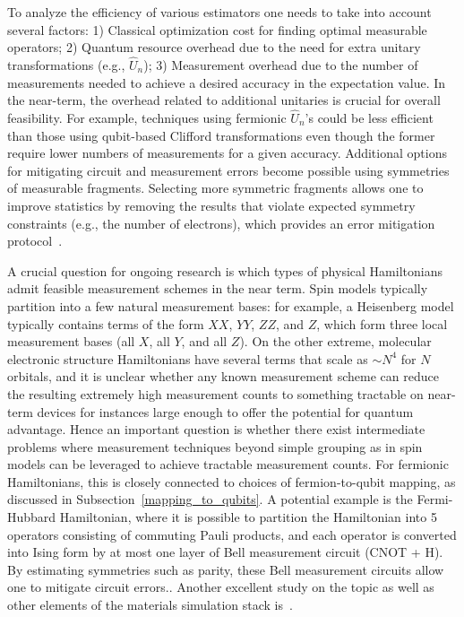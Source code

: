 To analyze the efficiency of various estimators one needs to take into account several factors: 1) Classical optimization cost for finding optimal measurable operators; 2) Quantum resource overhead due to the need for extra unitary transformations (e.g., $\hat U_n$); 3) Measurement overhead due to the number of measurements needed to achieve a desired accuracy in the expectation value. In the near-term, the overhead related to additional unitaries is crucial for overall feasibility.
For example, techniques using fermionic $\hat U_n$'s \cite{Huggins_Babbush:2021,motta2021low,yen2021cartan,choi2023fluid} could be less efficient than those using qubit-based Clifford transformations \cite{choi2022improving,yen2023deterministic} even though the former require lower numbers of measurements for a given accuracy.
Additional options for mitigating circuit and measurement errors become possible using symmetries of measurable fragments.
Selecting more symmetric fragments allows one to improve statistics by removing the results that violate expected symmetry constraints (e.g., the number of electrons), which provides an error mitigation protocol~\cite{Cai_2021,cai2023quantum,cohn2021quantum}.

A crucial question for ongoing research is which types of physical Hamiltonians admit feasible measurement schemes in the near term.
Spin models typically partition into a few natural measurement bases: for example, a Heisenberg model typically contains terms of the form $XX$, $YY$, $ZZ$, and $Z$, which form three local measurement bases (all $X$, all $Y$, and all $Z$).
On the other extreme, molecular electronic structure Hamiltonians have several terms that scale as $\sim N^4$ for $N$ orbitals, and it is unclear whether any known measurement scheme can reduce the resulting extremely high measurement counts to something tractable on near-term devices for instances large enough to offer the potential for quantum advantage.
Hence an important question is whether there exist intermediate problems where measurement techniques beyond simple grouping as in spin models can be leveraged to achieve tractable measurement counts.
For fermionic Hamiltonians, this is closely connected to choices of fermion-to-qubit mapping, as discussed in Subsection~\ref{mapping_to_qubits}.
A potential example is the Fermi-Hubbard Hamiltonian, where it is possible 
to partition the Hamiltonian into 5 operators consisting of commuting Pauli products, and each operator is converted into Ising form by at most one layer of Bell measurement circuit (CNOT + H).\cite{PhysRevB.102.235122} By estimating symmetries such as parity, these Bell measurement circuits allow one to mitigate circuit errors.\cite{PhysRevApplied.14.014059}.
Another excellent study on the topic as well as other elements of the materials simulation stack is~\cite{clinton2022towards}.


